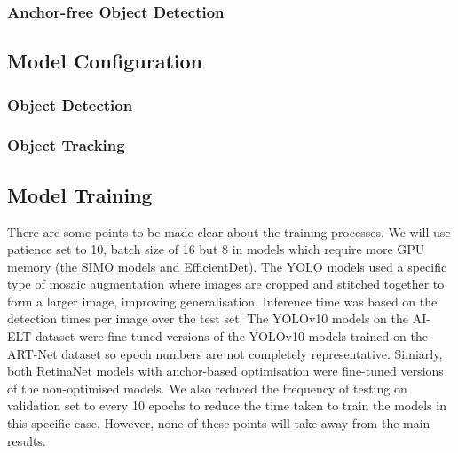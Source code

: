 
\subsubsection{Anchor-free Object Detection}


\subsection{Model Configuration}

\subsubsection{Object Detection}

\subsubsection{Object Tracking}

\subsection{Model Training}

There are some points to be made clear about the training processes. We will use patience set to 10, batch size of 16 but 8 in models which require more GPU memory (the SIMO models and EfficientDet). The YOLO models used a specific type of mosaic augmentation where images are cropped and stitched together to form a larger image, improving generalisation. Inference time was based on the detection times per image over the test set. The YOLOv10 models on the AI-ELT dataset were fine-tuned versions of the YOLOv10 models trained on the ART-Net dataset so epoch numbers are not completely representative. Simiarly, both RetinaNet models with anchor-based optimisation were fine-tuned versions of the non-optimised models. We also reduced the frequency of testing on validation set to every 10 epochs to reduce the time taken to train the models in this specific case. However, none of these points will take away from the main results.




